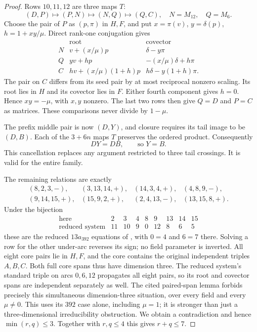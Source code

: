 \documentclass[11pt]{article}
\begin{document}
\begin{proof}
Rows $10,11,12$ are three maps $T$:
\[
 (D,P)\longmapsto(P,N)\longmapsto(N,Q)\longmapsto(Q,C),
 \quad N=M_{12},\quad Q=M_6.
\]
Choose the pair of $P$ as $(p,\pi)$ in $H,F$, and put
$x=\pi(v)$, $y=\delta(p)$, $h=1+xy/\mu$.
Direct rank-one conjugation gives
\[
\begin{array}{c|c|c}
 &\text{root}&\text{covector}\\\hline
N&v+(x/\mu)p&\delta-y\pi\\
Q&yv+hp&-(x/\mu)\delta+h\pi\\
C&hv+(x/\mu)(1+h)p&h\delta-y(1+h)\pi.
\end{array}
\]
The pair on $C$ differs from its seed pair by at most reciprocal
nonzero scaling. Its root lies in $H$ and its covector lies in $F$.
Either fourth component gives $h=0$. Hence $xy=-\mu$, with $x,y$
nonzero. The last two rows then give $Q=D$ and $P=C$ as matrices.
These comparisons never divide by $1-\mu$.

The prefix middle pair is now $(D,Y)$, and closure requires its tail
image to be $(D,B)$. Each of the $3+6n$ maps $T$ preserves the ordered
product. Consequently
\[
                    DY=DB,\qquad\text{so }Y=B.
\]
This cancellation replaces any argument restricted to three tail
crossings. It is valid for the entire family.

The remaining relations are exactly
\begin{equation}\label{eq:core}
\begin{array}{rrrr}
(8,2,3,-),&(3,13,14,+),&(14,3,4,+),&(4,8,9,-),\\
(9,14,15,+),&(15,9,2,+),&(2,4,13,-),&(13,15,8,+).
\end{array}
\end{equation}
Under the bijection
\[
\begin{array}{c|rrrrrrrr}
\text{here}&2&3&4&8&9&13&14&15\\\hline
\text{reduced system}&11&10&9&0&12&8&6&5
\end{array}
\]
these are the reduced $13a_{392}$ equations of
\cite[Lemma \texttt{lem:cores}, $392$ case]{extensions}, with
$0=4$ and $6=7$ there. Solving a row for the other under-arc reverses
its sign; no field parameter is inverted.
All eight core pairs lie in $H,F$, and the core contains the original
independent triples $A,B,C$. Both full core spans thus have dimension
three. The reduced system's standard triple on arcs $0,6,12$
propagates all eight pairs, so its root and covector spans are
independent separately as well. The cited paired-span lemma forbids
precisely this simultaneous dimension-three situation, over every
field and every $\mu\ne0$. This uses its $392$ case alone, including
$\mu=1$; it is stronger than just a three-dimensional irreducibility
obstruction. We obtain a contradiction and hence $\min(r,q)\le3$.
Together with $r,q\le4$ this gives $r+q\le7$.
\end{proof}
\end{document}
